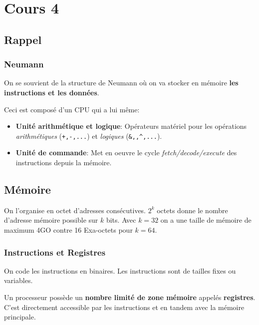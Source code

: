 \section{Cours 4}\label{cours-4}

\subsection{Rappel}\label{rappel}

\subsubsection{Neumann}\label{neumann}

On se souvient de la structure de Neumann où on va stocker en mémoire
\textbf{les instructions et les données}.

Ceci est composé d'un CPU qui a lui même:

\begin{itemize}
\tightlist
\item
  \textbf{Unité arithmétique et logique}: Opérateurs matériel pour les
  opérations \emph{arithmétiques} (\texttt{+,-,...}) et \emph{logiques}
  (\texttt{\&,\textbar{},\^{},...}).
\item
  \textbf{Unité de commande}: Met en oeuvre le cycle
  \emph{fetch/decode/execute} des instructions depuis la mémoire.
\end{itemize}

\subsection{Mémoire}\label{muxe9moire}

On l'organise en octet d'adresses consécutives. \(2^k\) octets donne le
nombre d'adresse mémoire possible sur \(k\) bits. Avec \(k=32\) on a une
taille de mémoire de maximum 4GO contre 16 Exa-octets pour \(k=64\).

\subsubsection{Instructions et
Registres}\label{instructions-et-registres}

On code les instructions en binaires. Les instructions sont de tailles
fixes ou variables.

Un processeur possède un \textbf{nombre limité de zone mémoire} appelés
\textbf{registres}. C'est directement accessible par les instructions et
en tandem avec la mémoire principale.

